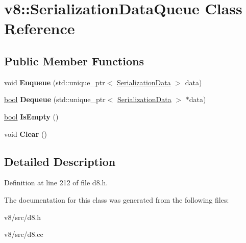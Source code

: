 \hypertarget{classv8_1_1SerializationDataQueue}{}\section{v8\+:\+:Serialization\+Data\+Queue Class Reference}
\label{classv8_1_1SerializationDataQueue}
\subsection*{Public Member Functions}
\begin{DoxyCompactItemize}
\item 
\mbox{\label{classv8_1_1SerializationDataQueue_a29553b2dbd5de7b71087c0fc09c63174}} 
void {\bfseries Enqueue} (std\+::unique\+\_\+ptr$<$ \mbox{\hyperlink{classv8_1_1SerializationData}{Serialization\+Data}} $>$ data)
\item 
\mbox{\label{classv8_1_1SerializationDataQueue_a484b964c7f57003203c3c80905abd384}} 
\mbox{\hyperlink{classbool}{bool}} {\bfseries Dequeue} (std\+::unique\+\_\+ptr$<$ \mbox{\hyperlink{classv8_1_1SerializationData}{Serialization\+Data}} $>$ $\ast$data)
\item 
\mbox{\label{classv8_1_1SerializationDataQueue_a9103ef577bcfe534f12347a6c8480062}} 
\mbox{\hyperlink{classbool}{bool}} {\bfseries Is\+Empty} ()
\item 
\mbox{\label{classv8_1_1SerializationDataQueue_ab01f3774e08176cfb4d1dddfda6d04a4}} 
void {\bfseries Clear} ()
\end{DoxyCompactItemize}


\subsection{Detailed Description}


Definition at line 212 of file d8.\+h.



The documentation for this class was generated from the following files\+:\begin{DoxyCompactItemize}
\item 
v8/src/d8.\+h\item 
v8/src/d8.\+cc\end{DoxyCompactItemize}
